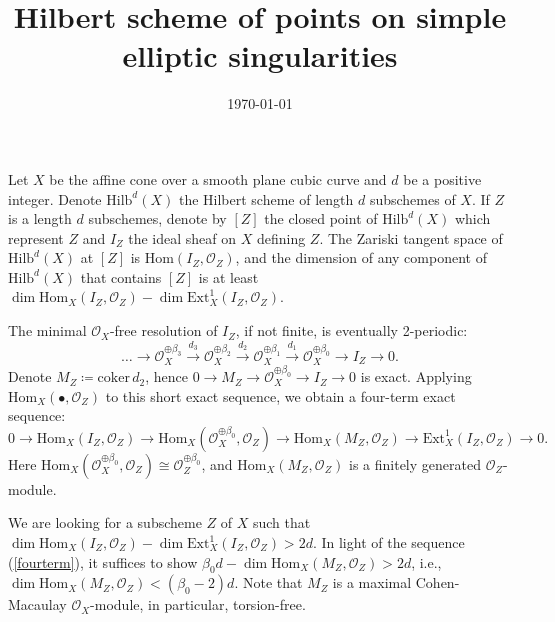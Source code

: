 \documentclass[12pt,oneside,reqno]{amsart}
\theoremstyle{definition}
\begin{document}
\title[Elliptic singularities]{Hilbert scheme of points on simple elliptic singularities}


\maketitle
\date{\today}

\section{}
Let $X$ be the affine cone over a smooth plane cubic curve and $d$ be a positive integer. Denote $\mathrm{Hilb}^d(X)$ the Hilbert scheme of length $d$ subschemes of $X$. If $Z$ is a length $d$ subschemes, denote by $[Z]$ the closed point of $\mathrm{Hilb}^d(X)$ which represent $Z$ and $I_Z$ the ideal sheaf on $X$ defining $Z$. The Zariski tangent space of $\mathrm{Hilb}^d(X)$ at $[Z]$ is $\mathrm{Hom}(I_Z, \mathcal{O}_Z)$, and the dimension of any component of $\mathrm{Hilb}^d(X)$ that contains $[Z]$ is at least $\dim \mathrm{Hom}_X(I_Z, \mathcal{O}_Z) - \dim \mathrm{Ext}^1_X(I_Z, \mathcal{O}_Z)$. 

The minimal $\mathcal{O}_X$-free resolution of $I_Z$, if not finite, is eventually 2-periodic: 
\[
\dots \to \mathcal{O}_X^{\oplus \beta_3} \xrightarrow{d_3} \mathcal{O}_X^{\oplus \beta_2} \xrightarrow{d_2} \mathcal{O}_X^{\oplus \beta_1} \xrightarrow{d_1} \mathcal{O}_X^{\oplus \beta_0} \to I_Z \to 0.
\]
Denote $M_Z \coloneqq \mathrm{coker} \,d_2$, hence $0 \to M_Z \to \mathcal{O}_X^{\oplus \beta_0} \to I_Z \to 0$ is exact. Applying $\mathrm{Hom}_X(\bullet, \mathcal{O}_Z)$ to this short exact sequence, we obtain a four-term exact sequence:
\begin{equation}\label{fourterm}
0 \to \mathrm{Hom}_X(I_Z, \mathcal{O}_Z) \to \mathrm{Hom}_X(\mathcal{O}_X^{\oplus \beta_0}, \mathcal{O}_Z)  \to \mathrm{Hom}_X(M_Z, \mathcal{O}_Z)  \to \mathrm{Ext}^1_X(I_Z, \mathcal{O}_Z) \to 0.
\end{equation}
Here $\mathrm{Hom}_X(\mathcal{O}_X^{\oplus \beta_0}, \mathcal{O}_Z) \cong \mathcal{O}_Z^{\oplus \beta_0}$, and $\mathrm{Hom}_X(M_Z, \mathcal{O}_Z)$ is a finitely generated $\mathcal{O}_Z$-module. 

We are looking for a subscheme $Z$ of $X$ such that $\dim \mathrm{Hom}_X(I_Z, \mathcal{O}_Z) - \dim \mathrm{Ext}^1_X(I_Z, \mathcal{O}_Z) > 2d$. In light of the  sequence (\ref{fourterm}), it suffices to show $\beta_0d - \dim \mathrm{Hom}_X(M_Z, \mathcal{O}_Z) > 2d$, i.e., $\dim \mathrm{Hom}_X(M_Z, \mathcal{O}_Z) < (\beta_0 - 2)d$. Note that $M_Z$ is a maximal Cohen-Macaulay $\mathcal{O}_X$-module, in particular, torsion-free. 
\end{document}
